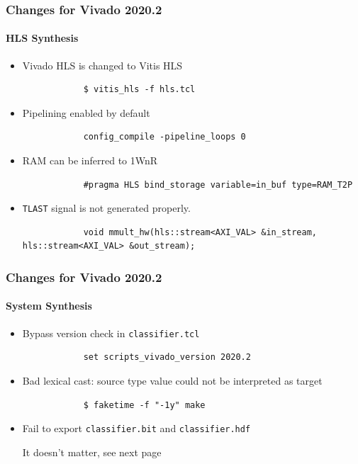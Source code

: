 \documentclass[aspectratio=169]{beamer}
\begin{document}
\begin{frame}[fragile]
    \frametitle{Changes for Vivado 2020.2}
    \framesubtitle{HLS Synthesis}

    \begin{itemize}
        \item Vivado HLS is changed to Vitis HLS
              \begin{verbatim}
            $ vitis_hls -f hls.tcl
        \end{verbatim}
        \item Pipelining enabled by default
              \begin{verbatim}
            config_compile -pipeline_loops 0
        \end{verbatim}
        \item RAM can be inferred to 1WnR
              \begin{verbatim}
            #pragma HLS bind_storage variable=in_buf type=RAM_T2P
        \end{verbatim}
        \item \texttt{TLAST} signal is not generated properly.
              \begin{verbatim}
            void mmult_hw(hls::stream<AXI_VAL> &in_stream, hls::stream<AXI_VAL> &out_stream);
        \end{verbatim}
    \end{itemize}

\end{frame}


\begin{frame}[fragile]
    \frametitle{Changes for Vivado 2020.2}
    \framesubtitle{System Synthesis}

    \begin{itemize}
        \item Bypass version check in \nolinkurl{classifier.tcl}
              \begin{verbatim}
            set scripts_vivado_version 2020.2
        \end{verbatim}
        \item Bad lexical cast: source type value could not be interpreted as target
              \begin{verbatim}
            $ faketime -f "-1y" make
        \end{verbatim}
        \item Fail to export \nolinkurl{classifier.bit} and \nolinkurl{classifier.hdf}

              It doesn't matter, see next page
    \end{itemize}

\end{frame}
\end{document}
